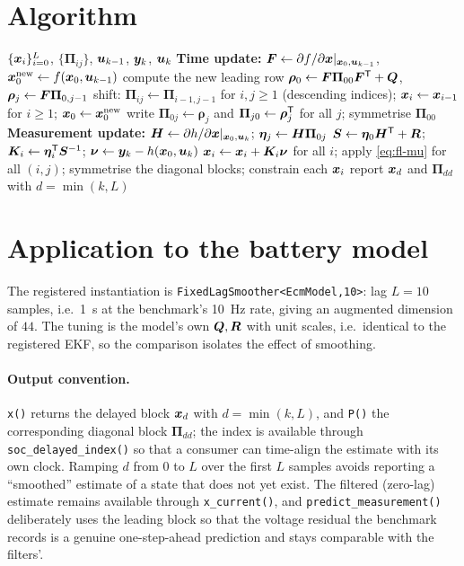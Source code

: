 \section{Algorithm}
\begin{algorithm}[H]
\caption{Fixed-lag EKF (lag $L$) --- one sampling period}
\begin{algorithmic}[1]
\Require $\{\bm{x}_i\}_{i=0}^{L}$, $\{\bm{\Pi}_{ij}\}$, $\bm{u}_{k-1}$, $\bm{y}_k$, $\bm{u}_k$
\State \textbf{Time update:} $\bm{F}\gets\partial f/\partial\bm{x}|_{\bm{x}_0,\bm{u}_{k-1}}$, $\bm{x}^\text{new}_0\gets f(\bm{x}_0,\bm{u}_{k-1})$
\State compute the new leading row $\bm{\rho}_0\gets\bm{F}\bm{\Pi}_{00}\bm{F}^{\mathsf{T}}+\bm{Q}$, $\bm{\rho}_j\gets\bm{F}\bm{\Pi}_{0,j-1}$ 
\State shift: $\bm{\Pi}_{ij}\gets\bm{\Pi}_{i-1,j-1}$ for $i,j\ge1$ (descending indices); $\bm{x}_i\gets\bm{x}_{i-1}$ for $i\ge1$; $\bm{x}_0\gets\bm{x}^\text{new}_0$
\State write $\bm{\Pi}_{0j}\gets\bm{\rho}_j$ and $\bm{\Pi}_{j0}\gets\bm{\rho}_j^{\mathsf{T}}$ for all $j$; symmetrise $\bm{\Pi}_{00}$
\State \textbf{Measurement update:} $\bm{H}\gets\partial h/\partial\bm{x}|_{\bm{x}_0,\bm{u}_k}$; $\bm{\eta}_j\gets\bm{H}\bm{\Pi}_{0j}$
\State $\bm{S}\gets\bm{\eta}_0\bm{H}^{\mathsf{T}}+\bm{R}$; $\bm{K}_i\gets\bm{\eta}_i^{\mathsf{T}}\bm{S}^{-1}$; $\bm{\nu}\gets\bm{y}_k-h(\bm{x}_0,\bm{u}_k)$
\State $\bm{x}_i\gets\bm{x}_i+\bm{K}_i\bm{\nu}$ for all $i$; apply \eqref{eq:fl-mu} for all $(i,j)$; symmetrise the diagonal blocks; constrain each $\bm{x}_i$
\Ensure report $\bm{x}_{d}$ and $\bm{\Pi}_{dd}$ with $d=\min(k,L)$
\end{algorithmic}
\end{algorithm}

\section{Application to the battery model}
The registered instantiation is \texttt{FixedLagSmoother<EcmModel,10>}: lag $L=10$ samples,
i.e.\ \SI{1}{\second} at the benchmark's \SI{10}{\hertz} rate, giving an augmented dimension of
$44$.  The tuning is the model's own $\bm{Q},\bm{R}$ with unit scales, i.e.\ identical to the registered
EKF, so the comparison isolates the effect of smoothing.

\paragraph{Output convention.}  \texttt{x()} returns the delayed block $\bm{x}_d$ with
$d=\min(k,L)$, and \texttt{P()} the corresponding diagonal block $\bm{\Pi}_{dd}$; the index is
available through \texttt{soc\_delayed\_index()} so that a consumer can time-align the estimate with
its own clock.  Ramping $d$ from $0$ to $L$ over the first $L$ samples avoids reporting a
``smoothed'' estimate of a state that does not yet exist.  The filtered (zero-lag) estimate remains
available through \texttt{x\_current()}, and \texttt{predict\_measurement()} deliberately uses the
leading block so that the voltage residual the benchmark records is a genuine one-step-ahead
prediction and stays comparable with the filters'.

